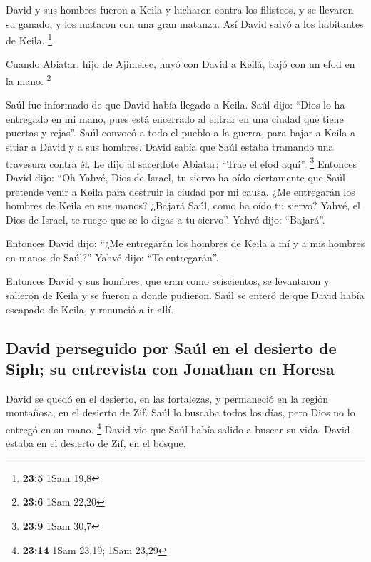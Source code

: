  David y sus hombres fueron a Keila y lucharon contra los
filisteos, y se llevaron su ganado, y los mataron con una gran matanza.
Así David salvó a los habitantes de Keila. \footnote{\textbf{23:5} 1Sam
  19,8}

 Cuando Abiatar, hijo de Ajimelec, huyó con David a Keilá,
bajó con un efod en la mano. \footnote{\textbf{23:6} 1Sam 22,20}

 Saúl fue informado de que David había llegado a Keila.
Saúl dijo: ``Dios lo ha entregado en mi mano, pues está encerrado al
entrar en una ciudad que tiene puertas y rejas''.  Saúl
convocó a todo el pueblo a la guerra, para bajar a Keila a sitiar a
David y a sus hombres.  David sabía que Saúl estaba
tramando una travesura contra él. Le dijo al sacerdote Abiatar: ``Trae
el efod aquí''. \footnote{\textbf{23:9} 1Sam 30,7} 
Entonces David dijo: ``Oh Yahvé, Dios de Israel, tu siervo ha oído
ciertamente que Saúl pretende venir a Keila para destruir la ciudad por
mi causa.  ¿Me entregarán los hombres de Keila en sus
manos? ¿Bajará Saúl, como ha oído tu siervo? Yahvé, el Dios de Israel,
te ruego que se lo digas a tu siervo''. Yahvé dijo: ``Bajará''.

 Entonces David dijo: ``¿Me entregarán los hombres de
Keila a mí y a mis hombres en manos de Saúl?'' Yahvé dijo: ``Te
entregarán''.

 Entonces David y sus hombres, que eran como seiscientos,
se levantaron y salieron de Keila y se fueron a donde pudieron. Saúl se
enteró de que David había escapado de Keila, y renunció a ir allí.

\hypertarget{david-perseguido-por-sauxfal-en-el-desierto-de-siph-su-entrevista-con-jonathan-en-horesa}{%
\subsection{David perseguido por Saúl en el desierto de Siph; su
entrevista con Jonathan en
Horesa}\label{david-perseguido-por-sauxfal-en-el-desierto-de-siph-su-entrevista-con-jonathan-en-horesa}}

 David se quedó en el desierto, en las fortalezas, y
permaneció en la región montañosa, en el desierto de Zif. Saúl lo
buscaba todos los días, pero Dios no lo entregó en su mano. \footnote{\textbf{23:14}
  1Sam 23,19; 1Sam 23,29}  David vio que Saúl había
salido a buscar su vida. David estaba en el desierto de Zif, en el
bosque.

